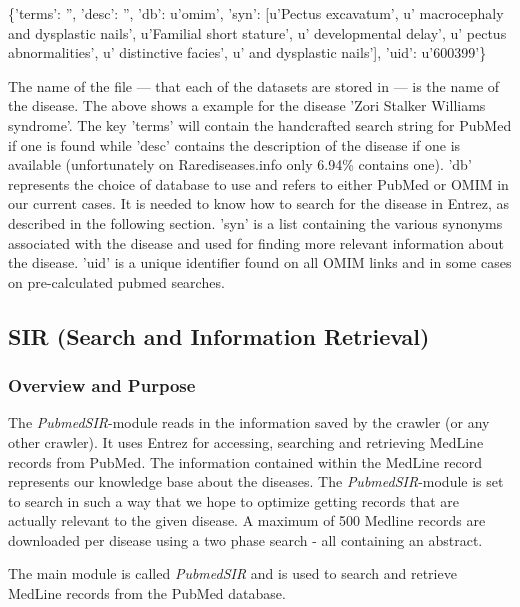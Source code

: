 \begin{center}
{\small
\{'terms': '', 'desc': '', 'db': u'omim', 'syn': [u'Pectus excavatum', u' macrocephaly and dysplastic nails', u'Familial short stature', u' developmental delay', u' pectus abnormalities', u' distinctive facies', u' and dysplastic nails'], 'uid': u'600399'\} 
}
\end{center}

The name of the file --- that each of the datasets are stored in --- is the
name of the disease. The above shows a example for the disease 'Zori
Stalker Williams syndrome'. The key 'terms' will contain the
handcrafted search string for PubMed if one is found while 'desc'
contains the description of the disease if one is available
(unfortunately on Rarediseases.info only 6.94\% contains one). 'db'
represents the choice of database to use and refers to either PubMed
or OMIM in our current cases. It is needed to know how to search for
the disease in Entrez, as described in the following section. 'syn' is
a list containing the various synonyms associated with the disease and
used for finding more relevant information about the disease. 'uid' is
a unique identifier found on all OMIM links and in some cases on
pre-calculated pubmed searches.

\subsection{SIR (Search and Information Retrieval)\label{SIR}}

\subsubsection{Overview and Purpose}
The \textit{PubmedSIR}-module reads in the information saved by the crawler (or any
other crawler). It uses Entrez for accessing, searching and retrieving
MedLine records from PubMed. The information contained within the
MedLine record represents our knowledge base about the diseases. The
\textit{PubmedSIR}-module is set to search in such a way that we hope to optimize
getting records that are actually relevant to the given disease. A
maximum of 500 Medline records are downloaded per disease using a two
phase search - all containing an abstract.

The main module is called \textit{PubmedSIR} and is used to search and
retrieve MedLine records from the PubMed database.


